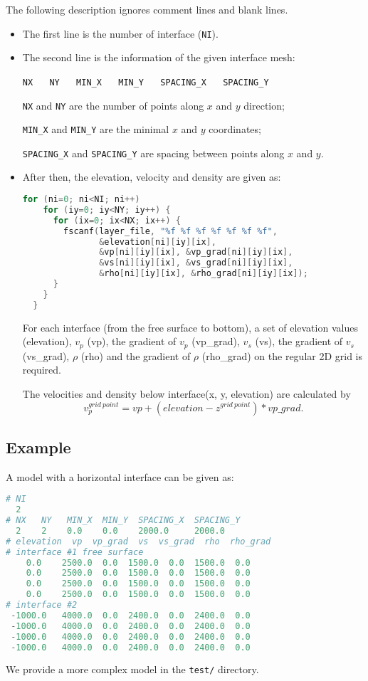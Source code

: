 The following description ignores comment lines and blank lines.
\begin{itemize}
 \item The first line is the number of interface (\texttt{NI}).
 \item {The second line is the information of the given interface mesh:
  
  \texttt{NX} ~~ \texttt{NY} ~~ \texttt{MIN\_X} ~~ \texttt{MIN\_Y} ~~ \texttt{SPACING\_X} ~~ \texttt{SPACING\_Y}

  \texttt{NX} and \texttt{NY} are the number of points along $x$ and $y$ direction;

  \texttt{MIN\_X} and \texttt{MIN\_Y} are the minimal $x$ and $y$ coordinates;

  \texttt{SPACING\_X} and \texttt{SPACING\_Y} are spacing between points along $x$ and $y$.
 }
 \item {
  After then, the elevation, velocity and density are given as:
  \begin{lstlisting}[language = C]
  for (ni=0; ni<NI; ni++)
    for (iy=0; iy<NY; iy++) {
      for (ix=0; ix<NX; ix++) { 
        fscanf(layer_file, "%f %f %f %f %f %f %f", 
               &elevation[ni][iy][ix],
               &vp[ni][iy][ix], &vp_grad[ni][iy][ix],
               &vs[ni][iy][ix], &vs_grad[ni][iy][ix],
               &rho[ni][iy][ix], &rho_grad[ni][iy][ix]);
      }
    }
  }
  \end{lstlisting}
 }
 For each interface (from the free surface to bottom), a set of elevation values (elevation),
 $v_p$ (vp), the gradient of $v_p$ (vp\_grad), $v_s$ (vs), the gradient of $v_s$ (vs\_grad), $\rho$ (rho) and the gradient of $\rho$ (rho\_grad) on the regular 2D grid is required. 

 The velocities and density below interface(x, y, elevation) are calculated by
 \begin{equation*}
    v_p^{grid~point} = vp + (elevation-z^{grid~point}) * vp\_grad.
 \end{equation*} 
\end{itemize}

\subsection{Example}

A model with a horizontal interface can be given as:

\begin{lstlisting}[language=python, title=test.md3lay, frame=tb]
# NI
  2
# NX   NY   MIN_X  MIN_Y  SPACING_X  SPACING_Y 
  2    2    0.0    0.0    2000.0     2000.0
# elevation  vp  vp_grad  vs  vs_grad  rho  rho_grad
# interface #1 free surface
    0.0    2500.0  0.0  1500.0  0.0  1500.0  0.0   
    0.0    2500.0  0.0  1500.0  0.0  1500.0  0.0
    0.0    2500.0  0.0  1500.0  0.0  1500.0  0.0
    0.0    2500.0  0.0  1500.0  0.0  1500.0  0.0
# interface #2 
 -1000.0   4000.0  0.0  2400.0  0.0  2400.0  0.0   
 -1000.0   4000.0  0.0  2400.0  0.0  2400.0  0.0
 -1000.0   4000.0  0.0  2400.0  0.0  2400.0  0.0
 -1000.0   4000.0  0.0  2400.0  0.0  2400.0  0.0 
\end{lstlisting}
We provide a more complex model in the \texttt{test/} directory.

